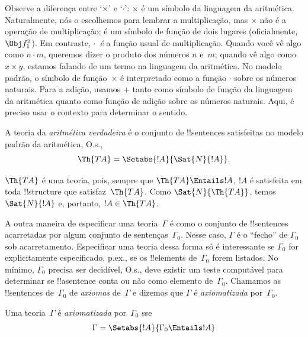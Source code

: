 \documentclass[../../../include/open-logic-section]{subfiles}
\begin{document}
Observe a diferença entre `$\times$' e `$\cdot$': $\times$ é um
símbolo da linguagem da aritmética. Naturalmente, nós o escolhemos para
lembrar a multiplicação, mas $\times$ não é a operação de multiplicação;
é um símbolo de função de dois lugares (oficialmente, $\Obj f^2_1$).
Em contraste, $\cdot$~\emph{é} a função usual de multiplicação. Quando
você vê algo como $n \cdot m$, queremos dizer o produto dos números
$n$ e~$m$; quando vê algo como $x \times y$, estamos falando de um termo
na linguagem da aritmética. No modelo padrão, o símbolo de
função~$\times$ é interpretado como a função $\cdot$ sobre os números
naturais. Para a adição, usamos $+$ tanto como símbolo de função da
linguagem da aritmética quanto como função de adição sobre os números
naturais. Aqui, é preciso usar o contexto para determinar o sentido.

\begin{defn}
A teoria da \emph{aritmética verdadeira} é o conjunto de
!!{sentence}s satisfeitas no modelo padrão da aritmética, O.s.\@,
\[
\Th{TA} = \Setabs{!A}{\Sat{N}{!A}}.
\]
\end{defn}

$\Th{TA}$ é uma teoria, pois, sempre que $\Th{TA} \Entails !A$,
$!A$ é satisfeita em toda !!{structure} que satisfaz~$\Th{TA}$. Como
$\Sat{N}{\Th{TA}}$, temos~$\Sat{N}{!A}$ e, portanto,
$!A \in \Th{TA}$.

A outra maneira de especificar uma teoria~$\Gamma$ é como o conjunto
de !!{sentence}s acarretadas por algum conjunto de sentenças~$\Gamma_0$.
Nesse caso, $\Gamma$ é o ``fecho'' de $\Gamma_0$ sob acarretamento.
Especificar uma teoria dessa forma só é interessante se $\Gamma_0$ for
explicitamente especificado, p.ex., se os !!{element}s
de~$\Gamma_0$ forem listados. No mínimo, $\Gamma_0$ precisa ser
decidível, O.s.\@, deve existir um teste computável para determinar se
!!a{sentence} conta ou não como elemento de~$\Gamma_0$. Chamamos as
!!{sentence}s de~$\Gamma_0$ de \emph{axiomas} de~$\Gamma$ e dizemos que
$\Gamma$ é \emph{axiomatizada} por~$\Gamma_0$.

\begin{defn}
Uma teoria~$\Gamma$ é \emph{axiomatizada} por~$\Gamma_0$ sse
\[
\Gamma = \Setabs{!A}{\Gamma_0 \Entails !A}
\]
\end{defn}
\end{document}
